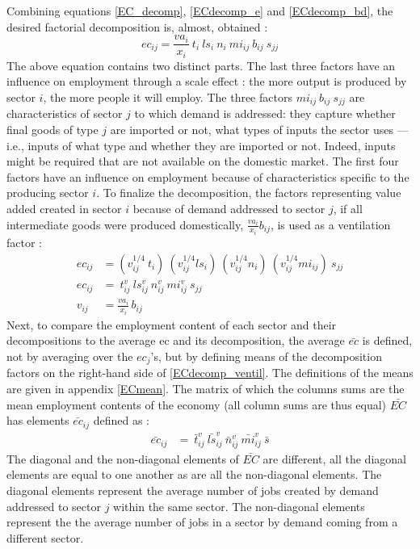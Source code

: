 \documentclass[12pt,english]{article}
\begin{document}
Combining equations \ref{EC_decomp}, \ref{ECdecomp_e} and \ref{ECdecomp_bd}, the desired factorial decomposition is, almost, obtained :
\begin{equation}
ec_{ij} = \frac{va_i}{x_i} \ t_i \ ls_i \ n_i \ mi_{ij} \ b_{ij} \ s_{jj}
\end{equation}
The above equation contains two distinct parts. The last three factors %
have an influence on employment through a scale effect : the more output is produced by sector $i$, the more people it will employ.%
The three factors $mi_{ij} \ b_{ij} \ s_{jj}$ are characteristics of sector $j$ to which demand is addressed: they capture whether final goods of type $j$ are imported or not, what types of inputs the sector uses --- i.e., inputs of what type and whether they are imported or not. Indeed, inputs might be required that are not available on the domestic market. The first four factors have an influence on employment because of characteristics specific to the producing sector $i$. To finalize the decomposition, the factors representing value added created in sector $i$ because of demand addressed to sector $j$, if all intermediate goods were produced domestically, $\frac{va_i}{x_i} b_{ij}$, is used as a ventilation factor :
\begin{align}
ec_{ij} &= (v_{ij}^{1/4} \ t_i) \ (v_{ij}^{1/4}ls_i) \ (v_{ij}^{1/4}n_i) \ (v_{ij}^{1/4}mi_{ij})  \ s_{jj}  \\
ec_{ij} &=  \ t^v_{ij} \ ls^v_{ij} \ n^v_{ij} \ mi^v_{ij}  \ s_{jj} \label{ECdecomp_ventil} \\
v_{ij} &=  \frac{va_i}{x_i} \, b_{ij}
\end{align}
Next, to compare the employment content of each sector and their decompositions to the average ec and its decomposition, the average $\bar{ec}$ is defined, not by averaging over the $ec_j$'s, but by defining means of the decomposition factors on the right-hand side of 
\ref{ECdecomp_ventil}. The definitions of the means are given in appendix \ref{ECmean}. The matrix of which the columns sums are the mean employment contents of the economy (all column sums are thus equal) $\bar{EC}$ has elements $\bar{ec}_{ij}$ defined as : 
\begin{align}
\bar{ec}_{ij} &=  \ \bar{t}^v_{ij} \ \bar{ls}^v_{ij} \ \bar{n}^v_{ij} \ \bar{mi}^v_{ij}  \ \bar{s} \label{ECdecomp_ventil_mean}
\end{align}
The diagonal and the non-diagonal elements of $\bar{EC}$ are different, all the diagonal elements are equal to one another as are all the non-diagonal elements. The diagonal elements represent the average number of jobs created by demand addressed to sector $j$ within the same sector. The non-diagonal elements represent the the average number of jobs in a sector by demand coming from a different sector. 
\end{document}
